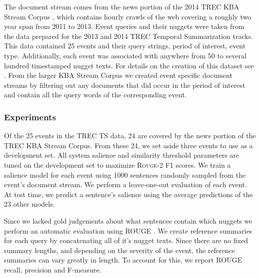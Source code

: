   The document stream comes from the news portion of the 2014 TREC
KBA Stream Corpus \citep{frank2012building}, which contains hourly crawls
of the web covering a roughly two year span from 2011 to 2013.
Event queries and their nuggets were taken from the data prepared for 
the 2013 and 2014 TREC Temporal Summarization tracks. This data
contained 25 events and their query strings, period of interest, 
event type. 
Additionally, each event was associated with anywhere from 50 to several
hundred timestamped nugget texts. 
For details on the creation of this dataset see \cite{aslam2014trec,aslam2015trec}.
From the larger KBA Stream Corpus we created event specific document 
streams by filtering out any documents that did occur in the period
of interest and contain all the query words of the corresponding event.  



    \subsubsection{Experiments}


Of the 25 events in the TREC TS data, 24 are
covered by the news portion of the TREC KBA
Stream Corpus. From these 24, we set aside
three events to use as a development set. All
system salience and similarity threshold parameters
are tuned on the development set to maximize
\textsc{Rouge-2} \textsc{F1} scores.
We train a salience model for each event using
1000 sentences randomly sampled from the
event's document stream.
We perform a leave-one-out evaluation of each
event. At test time, we predict a sentence’s
salience using the average predictions of the 23
other models.



    Since we lacked gold judgements about what sentences contain which nuggets
    we perform an automatic evaluation using ROUGE \cite{lin2004rouge}. We 
    create reference summaries for each query by concatenating all 
    of it's nugget texts.
    Since there are no fixed summary lengths, and depending on the severity
    of the event, the reference summaries can vary greatly in length.
    To account for this, we report ROUGE recall, precision and F-measure.

